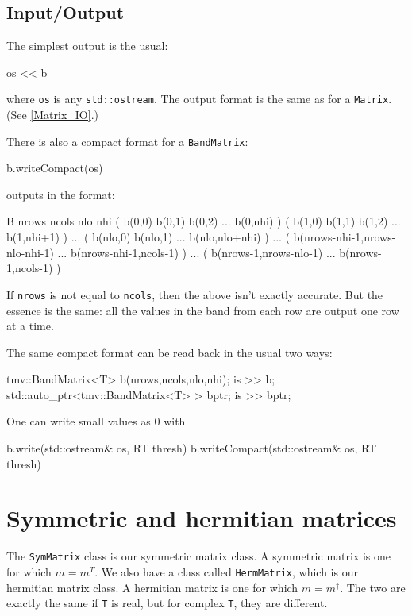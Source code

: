 \documentclass[twoside,letterpaper,11pt]{article}
\renewcommand{\tt}[1]{{\lstinline {#1}}}
\begin{document}
\subsection{Input/Output}
\label{BandMatrix_IO}

The simplest output is the usual:
\begin{tmvcode}
os << b
\end{tmvcode}
where \tt{os} is any \tt{std::ostream}.
The output format is the same as for a \tt{Matrix}.
(See \ref{Matrix_IO}.)

There is also a compact format for a \tt{BandMatrix}:
\begin{tmvcode}
b.writeCompact(os)
\end{tmvcode}
outputs in the format:
\begin{tmvcode}
B nrows ncols nlo nhi
( b(0,0)  b(0,1)  b(0,2) ... b(0,nhi) )
( b(1,0)  b(1,1)  b(1,2) ... b(1,nhi+1) )
...
( b(nlo,0)  b(nlo,1) ...  b(nlo,nlo+nhi) )
...
( b(nrows-nhi-1,nrows-nlo-nhi-1) ... b(nrows-nhi-1,ncols-1) )
...
( b(nrows-1,nrows-nlo-1)  ... b(nrows-1,ncols-1) )
\end{tmvcode}
If \tt{nrows} is not equal to \tt{ncols}, then the above isn't exactly accurate.  But the
essence is the same: all the values in the band from each row are output one row at a time.

The same compact format can be read back in the usual two ways:
\begin{tmvcode}
tmv::BandMatrix<T> b(nrows,ncols,nlo,nhi);
is >> b;
std::auto_ptr<tmv::BandMatrix<T> > bptr;
is >> bptr;
\end{tmvcode}

One can write small values as 0 with
\begin{tmvcode}
b.write(std::ostream& os, RT thresh)
b.writeCompact(std::ostream& os, RT thresh)
\end{tmvcode}

\newpage
\section{Symmetric and hermitian matrices}
\label{SymMatrix}

The \tt{SymMatrix} class is our symmetric matrix class.  A symmetric matrix is
one for which $m = m^T$.  We also have a class called
\tt{HermMatrix}, which is our hermitian matrix class.  A hermitian matrix
is one for which $m = m^\dagger$.  The two are exactly the same 
if \tt{T} is real, but for complex \tt{T}, they are different.
\end{document}
